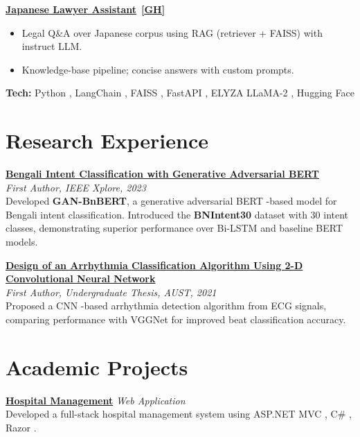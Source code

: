 \documentclass[10pt,letterpaper]{article}
\newcommand{\pill}[1]{%
  \begingroup\setlength{\fboxsep}{1.2pt}%
  \colorbox{brandblue!12}{\textcolor{brandblue}{\scriptsize #1}}%
  \endgroup
}
\newenvironment{project}{%
  \begin{tcolorbox}[
    enhanced,breakable,
    colback=white,colframe=white,
    borderline west={0.8pt}{0pt}{rail}, %
    left=10pt,right=0pt,top=2pt,bottom=2pt,
    boxsep=0pt,arc=0pt,outer arc=0pt,
    before skip=10pt,after skip=10pt
  ]%
  \setlength{\parskip}{6pt}\setlength{\parindent}{0pt}%
}{\end{tcolorbox}}
\newcommand{\ghicon}{\ifdefined\faGithub \faGithub \else \textbf{[GH]} \fi}
\newenvironment{projlist}{\begin{itemize}[leftmargin=*,nosep,topsep=0pt]\setlength{\itemsep}{1pt}}{\end{itemize}}
\newcommand{\ProjectHeading}[2]{\textbf{\href{#2}{#1}}\ \href{#2}{\ghicon}}
\begin{document}
\begin{project}
  \ProjectHeading{Japanese Lawyer Assistant}{https://github.com/Mehedi-Hasan-Abir/Japanese-Lawyer-Assistant-Langchain-LLM}
  \begin{projlist}
    \item Legal Q\&A over Japanese corpus using RAG (retriever + FAISS) with instruct LLM.
    \item Knowledge-base pipeline; concise answers with custom prompts.
  \end{projlist}
  {\footnotesize \textbf{Tech:} \pill{Python}, \pill{LangChain}, \pill{FAISS}, \pill{FastAPI}, \pill{ELYZA LLaMA-2}, \pill{Hugging Face}}
\end{project}


\section{Research Experience}

\textbf{\href{https://ieeexplore.ieee.org/document/10440989}{Bengali Intent Classification with Generative Adversarial BERT}} \\
\textit{First Author, IEEE Xplore, 2023} \\
Developed \textbf{GAN-BnBERT}, a generative adversarial \pill{BERT}-based model for Bengali intent classification. Introduced the \textbf{BNIntent30} dataset with 30 intent classes, demonstrating superior performance over \pill{Bi-LSTM} and baseline \pill{BERT} models.

\medskip

\textbf{\href{https://github.com/Mehedi-Hasan-Abir/ECG-Arrythmia-Classification}{Design of an Arrhythmia Classification Algorithm Using 2-D Convolutional Neural Network}} \\
\textit{First Author, Undergraduate Thesis, AUST, 2021} \\
Proposed a \pill{CNN}-based arrhythmia detection algorithm from \pill{ECG} signals, comparing performance with \pill{VGGNet} for improved beat classification accuracy.


\section{Academic Projects}

\textbf{\href{https://github.com/Mehedi-Hasan-Abir/HospitalManagement}{Hospital Management}}  \textbar{} \textit{Web Application} \\
Developed a full-stack hospital management system using \pill{ASP.NET MVC}, \pill{C\#}, \pill{Razor}. \medskip
\end{document}

